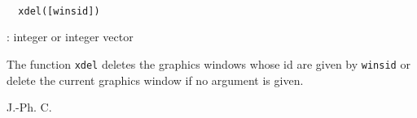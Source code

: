 \begin{mandesc}
  \\ 
\end{mandesc}
\begin{calling_sequence}
\begin{verbatim}
  xdel([winsid])   
\end{verbatim}
\end{calling_sequence}
\begin{parameters}
  \begin{varlist}
    : integer or integer vector\end{varlist}
\end{parameters}
\begin{mandescription}
  The function \verb!xdel! deletes the graphics windows whose id are given by 
  \verb!winsid! or delete the current graphics window if no argument is given.
\end{mandescription}
\begin{authors}
  J.-Ph. C.  
\end{authors}

